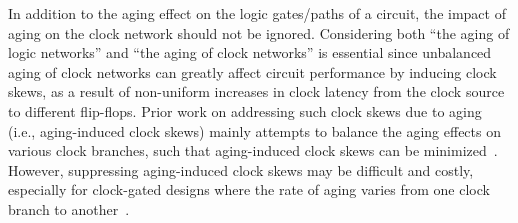 In addition to the aging effect on the logic gates/paths of a circuit, the impact of aging on the clock network should not be ignored. Considering both \enquote{the aging of logic networks} and \enquote{the aging of clock networks} is essential since unbalanced aging of clock networks can greatly affect circuit performance by inducing clock skews, as a result of non-uniform increases in clock latency from the clock source to different flip-flops. Prior work on addressing such clock skews due to aging (i.e., aging-induced clock skews) mainly attempts to balance the aging effects on various clock branches, such that aging-induced clock skews can be minimized~\cite{chen2013novel, huang2013low, chakraborty2013skew}. However, suppressing aging-induced clock skews may be difficult and costly, especially for clock-gated designs where the rate of aging varies from one clock branch to another~\cite{lai2014bti}.



